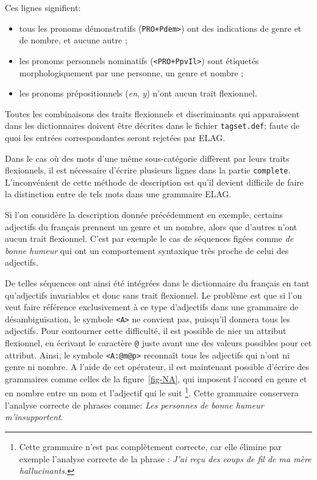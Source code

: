 \bigskip
\noindent Ces lignes signifient:
\begin{itemize}
  \item tous les pronoms démonstratifs (\verb$PRO+Pdem>$) ont des indications de 
  	  genre et de nombre, et aucune autre ;
  \item les pronoms personnels nominatifs (\verb$<PRO+PpvIl>$) sont étiquetés
  	  morphologiquement par une personne, un genre et nombre ;
  \item les pronoms prépositionnels (\textit{en}, \textit{y}) n’ont aucun trait flexionnel.
\end{itemize}

\bigskip
\noindent Toutes les combinaisons des traits flexionnels et discriminants qui apparaissent dans
les dictionnaires doivent être décrites dans le fichier \verb$tagset.def$;
 faute de quoi les entrées correspondantes seront rejetées par
ELAG.


\bigskip
\noindent Dans le cas où des mots d’une même sous-catégorie diffèrent par leurs traits flexionnels,
il est nécessaire d’écrire plusieurs lignes dans la partie \verb$complete$. L’inconvénient de cette
méthode de description est qu’il devient difficile de faire la distinction entre de tels mots
dans une grammaire ELAG.


\bigskip
\noindent Si l’on considère la description donnée précédemment en exemple, certains adjectifs du
français prennent un genre et un nombre, alors que d’autres n’ont aucun trait flexionnel.
C’est par exemple le cas de séquences figées comme \textit{de bonne humeur} qui ont un comportement
syntaxique très proche de celui des adjectifs.


\bigskip
\noindent De telles séquences ont ainsi été intégrées dans le dictionnaire du français en tant
qu’adjectifs invariables et donc sans trait flexionnel. Le problème est que si l’on veut faire
référence exclusivement à ce type d’adjectifs dans une grammaire de désambiguïsation, le symbole
 \verb$<A>$ ne convient pas, puisqu’il donnera tous les adjectifs.
Pour contourner cette difficulté, il est possible de nier un attribut flexionnel, en écrivant
le caractère \verb$@$ juste avant une des valeurs possibles pour cet attribut. Ainsi, le symbole
\verb$<A:@m@p>$ reconnaît tous les adjectifs qui n’ont ni genre ni nombre. A l’aide de cet opérateur, il 
est maintenant possible d’écrire des grammaires comme celles de la figure~\ref{fig-NA}, qui 
imposent l’accord en genre et en nombre entre un nom et l’adjectif qui le suit
\footnote{   Cette grammaire n’est pas complètement correcte, car elle élimine par exemple l’analyse correcte de la
phrase : \textit{J'ai re\c{c}u des coups de fil de ma m\`ere hallucinants.}}.
Cette grammaire conservera l’analyse correcte de phrases comme: \textit{Les
personnes de bonne humeur m'insupportent}.

